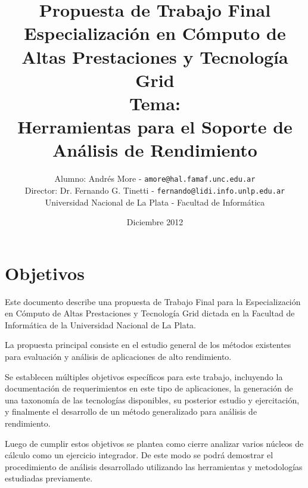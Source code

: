 \documentclass[a4paper]{article}
\begin{document}
\title{Propuesta de Trabajo Final\\
\bigskip
Especializaci\'on en C\'omputo de Altas Prestaciones y Tecnolog\'ia Grid\\
\bigskip
Tema:\\
Herramientas para el Soporte de An\'alisis de Rendimiento}

\author{Alumno: Andr\'es More - {\tt amore@hal.famaf.unc.edu.ar}
\\Director: Dr. Fernando G. Tinetti - {\tt fernando@lidi.info.unlp.edu.ar}
\bigskip
\\Universidad Nacional de La Plata - Facultad de Inform\'atica}

\date{Diciembre 2012}

\maketitle

\newpage

\section{Objetivos}

  Este documento describe una propuesta de Trabajo Final para la
  Especializaci\'on en C\'omputo de Altas Prestaciones y Tecnolog\'ia Grid
  dictada en la Facultad de Inform\'atica de la Universidad Nacional de La
  Plata.

  \smallskip

  La propuesta principal consiste en el estudio general de los m\'etodos
  existentes para evaluaci\'on y an\'alisis de aplicaciones de alto
  rendimiento.

  \smallskip

  Se establecen m\'ultiples objetivos espec\'ificos para
  este trabajo, incluyendo la documentaci\'on de requerimientos en este
  tipo de aplicaciones, la generaci\'on de una taxonom\'ia de las
  tecnolog\'ias disponibles, su posterior estudio y ejercitaci\'on, y
  finalmente el desarrollo de un m\'etodo generalizado para an\'alisis de
  rendimiento.

  \smallskip

  Luego de cumplir estos objetivos se plantea como cierre analizar
  varios n\'ucleos de c\'alculo como un ejercicio integrador. De este modo
  se podr\'a demostrar el procedimiento de an\'alisis desarrollado
  utilizando las herramientas y metodolog\'ias estudiadas previamente.

  \smallskip
\end{document}
